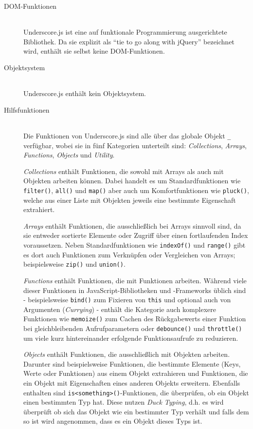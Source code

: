 \begin{description}
\item[DOM-Funktionen] \hfill \\
Underscore.js ist eine auf funktionale Programmierung ausgerichtete Bibliothek. Da sie explizit als
\enquote{tie to go along with jQuery} bezeichnet wird, enthält sie selbst keine DOM-Funktionen.

\item[Objektsystem] \hfill \\
Underscore.js enthält kein Objektsystem.

\item[Hilfsfunktionen] \hfill \\
Die Funktionen von Underscore.js sind alle über das globale Objekt \lstinline{_} verfügbar, wobei
sie in fünf Kategorien unterteilt sind: \emph{Collections}, \emph{Arrays}, \emph{Functions},
\emph{Objects} und \emph{Utility}.

\emph{Collections} enthält Funktionen, die sowohl mit Arrays als auch mit Objekten arbeiten können.
Dabei handelt es um Standardfunktionen wie \lstinline{filter()}, \lstinline{all()} und
\lstinline{map()} aber auch um Komfortfunktionen wie \lstinline{pluck()}, welche aus einer Liste mit
Objekten jeweils eine bestimmte Eigenschaft extrahiert.

\emph{Arrays} enthält Funktionen, die ausschließlich bei Arrays sinnvoll sind, da sie entweder
sortierte Elemente oder Zugriff über einen fortlaufenden Index voraussetzen. Neben
Standardfunktionen wie \lstinline{indexOf()} und \lstinline{range()} gibt es dort auch Funktionen
zum Verknüpfen oder Vergleichen von Arrays; beispielsweise \lstinline{zip()} und
\lstinline{union()}.

\emph{Functions} enthält Funktionen, die mit Funktionen arbeiten. Während viele dieser Funktionen in
JavaScript-Bibliotheken und -Frameworks üblich sind - beispielsweise \lstinline{bind()} zum Fixieren
von \lstinline{this} und optional auch von Argumenten (\emph{Currying}) - enthält die Kategorie auch
komplexere Funktionen wie \lstinline{memoize()} zum Cachen des Rückgabewerts einer Funktion bei
gleichbleibenden Aufrufparametern oder \lstinline{debounce()} und \lstinline{throttle()} um viele
kurz hintereinander erfolgende Funktionsaufrufe zu reduzieren.

\emph{Objects} enthält Funktionen, die ausschließlich mit Objekten arbeiten. Darunter sind
beispielsweise Funktionen, die bestimmte Elemente (Keys, Werte oder Funktionen) aus einem Objekt
extrahieren und Funktionen, die ein Objekt mit Eigenschaften eines anderen Objekts erweitern.
Ebenfalls enthalten sind \lstinline{is<something>()}-Funktionen, die überprüfen, ob ein Objekt einen
bestimmten Typ hat. Diese nutzen \emph{Duck Typing}, d.h. es wird überprüft ob sich das Objekt wie
ein bestimmter Typ verhält und falls dem so ist wird angenommen, dass es ein Objekt dieses Typs ist.


\end{description}
